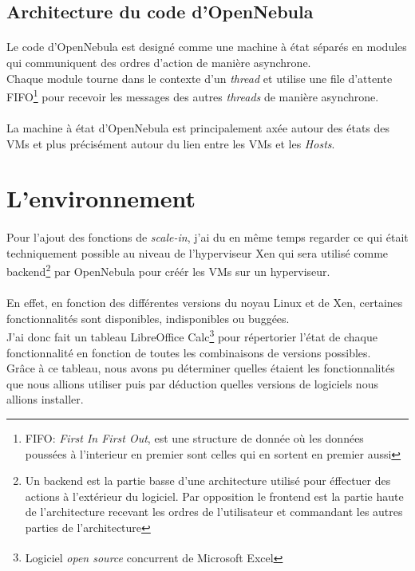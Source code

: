\subsection{Architecture du code d'OpenNebula}
\paragraph*{}
Le code d'OpenNebula est designé comme une machine à état séparés en modules qui communiquent des ordres d'action de manière asynchrone.
\\
Chaque module tourne dans le contexte d'un \emph{thread} et utilise une file d'attente FIFO\footnote{FIFO: \emph{First In First Out}, est une structure de donnée où les données poussées à l'interieur
en premier sont celles qui en sortent en premier aussi} pour recevoir les messages des autres \emph{threads} de manière asynchrone.

\paragraph*{}
La machine à état d'OpenNebula est principalement axée autour des états des VMs et plus précisément autour du lien entre les VMs et les \emph{Hosts}.


\section{L'environnement}

\paragraph*{}
Pour l'ajout des fonctions de \emph{scale-in}, j'ai du en même temps regarder ce qui était techniquement possible au niveau de l'hyperviseur Xen qui
sera utilisé comme backend\footnote{Un backend est la partie basse d'une architecture utilisé pour éffectuer des actions à l'extérieur du logiciel.
Par opposition le frontend est la partie haute de l'architecture recevant les ordres de l'utilisateur et commandant les autres parties de l'architecture}
par OpenNebula pour créér les VMs sur un hyperviseur.

\paragraph*{}
En effet, en fonction des différentes versions du noyau Linux et de Xen, certaines fonctionnalités sont disponibles, indisponibles ou buggées.\\
J'ai donc fait un tableau LibreOffice Calc\footnote{Logiciel \emph{open source} concurrent de Microsoft\textsuperscript{\textregistered} Excel\texttrademark}
pour répertorier l'état de chaque fonctionnalité en fonction de toutes les combinaisons de versions possibles.
\\
Grâce à ce tableau, nous avons pu déterminer quelles étaient les fonctionnalités que nous allions utiliser puis par déduction quelles versions de logiciels nous
allions installer.

